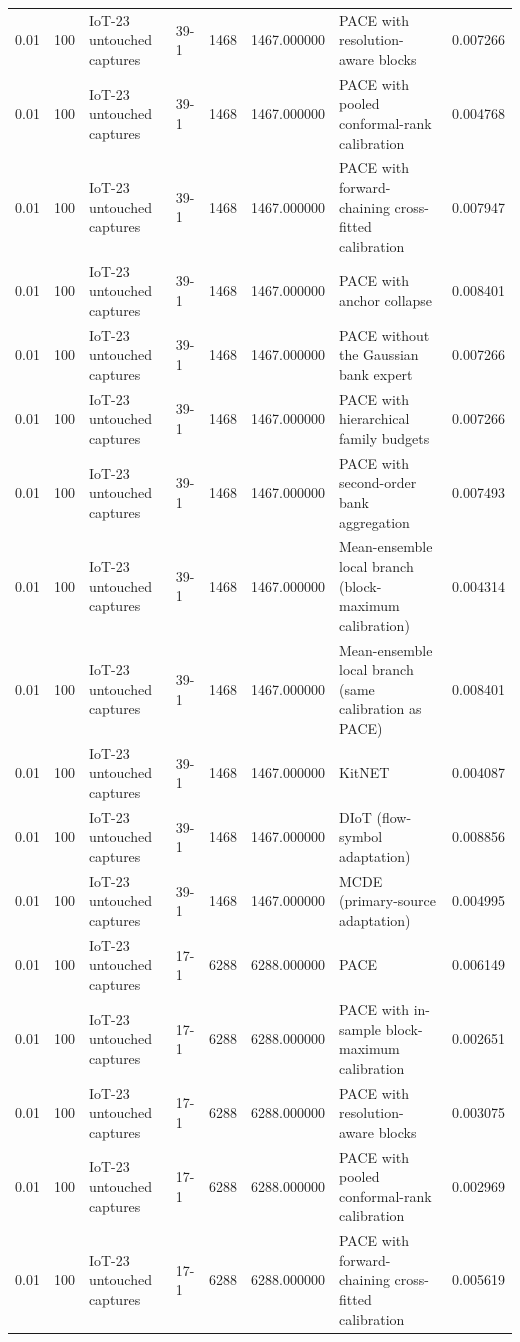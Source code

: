 \begin{tabular}{llllllll}
0.01 & 100 & IoT-23 untouched captures & 39-1 & 1468 & 1467.000000 & PACE with resolution-aware blocks & 0.007266 \\
0.01 & 100 & IoT-23 untouched captures & 39-1 & 1468 & 1467.000000 & PACE with pooled conformal-rank calibration & 0.004768 \\
0.01 & 100 & IoT-23 untouched captures & 39-1 & 1468 & 1467.000000 & PACE with forward-chaining cross-fitted calibration & 0.007947 \\
0.01 & 100 & IoT-23 untouched captures & 39-1 & 1468 & 1467.000000 & PACE with anchor collapse & 0.008401 \\
0.01 & 100 & IoT-23 untouched captures & 39-1 & 1468 & 1467.000000 & PACE without the Gaussian bank expert & 0.007266 \\
0.01 & 100 & IoT-23 untouched captures & 39-1 & 1468 & 1467.000000 & PACE with hierarchical family budgets & 0.007266 \\
0.01 & 100 & IoT-23 untouched captures & 39-1 & 1468 & 1467.000000 & PACE with second-order bank aggregation & 0.007493 \\
0.01 & 100 & IoT-23 untouched captures & 39-1 & 1468 & 1467.000000 & Mean-ensemble local branch (block-maximum calibration) & 0.004314 \\
0.01 & 100 & IoT-23 untouched captures & 39-1 & 1468 & 1467.000000 & Mean-ensemble local branch (same calibration as PACE) & 0.008401 \\
0.01 & 100 & IoT-23 untouched captures & 39-1 & 1468 & 1467.000000 & KitNET & 0.004087 \\
0.01 & 100 & IoT-23 untouched captures & 39-1 & 1468 & 1467.000000 & DIoT (flow-symbol adaptation) & 0.008856 \\
0.01 & 100 & IoT-23 untouched captures & 39-1 & 1468 & 1467.000000 & MCDE (primary-source adaptation) & 0.004995 \\
0.01 & 100 & IoT-23 untouched captures & 17-1 & 6288 & 6288.000000 & PACE & 0.006149 \\
0.01 & 100 & IoT-23 untouched captures & 17-1 & 6288 & 6288.000000 & PACE with in-sample block-maximum calibration & 0.002651 \\
0.01 & 100 & IoT-23 untouched captures & 17-1 & 6288 & 6288.000000 & PACE with resolution-aware blocks & 0.003075 \\
0.01 & 100 & IoT-23 untouched captures & 17-1 & 6288 & 6288.000000 & PACE with pooled conformal-rank calibration & 0.002969 \\
0.01 & 100 & IoT-23 untouched captures & 17-1 & 6288 & 6288.000000 & PACE with forward-chaining cross-fitted calibration & 0.005619 \\

\end{tabular}
